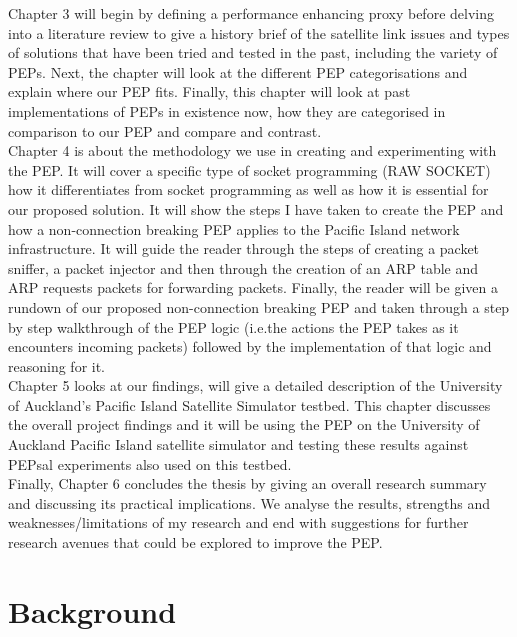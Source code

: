 \documentclass{uathesis}
\begin{document}
Chapter 3 will begin by defining a performance enhancing proxy before delving into a literature review to give a history brief of the satellite link issues and types of solutions that have been tried and tested in the past, including the variety of PEPs. Next, the chapter will look at the different PEP categorisations and explain where our PEP fits. Finally, this chapter will look at past implementations of PEPs in existence now, how they are categorised in comparison to our PEP and compare and contrast. \\ 

Chapter 4 is about the methodology we use in creating and experimenting with the PEP. It will cover a specific type of socket programming (RAW SOCKET) how it differentiates from socket programming as well as how it is essential for our proposed solution. It will show the steps I have taken to create the PEP and how a non-connection breaking PEP applies to the Pacific Island network infrastructure. It will guide the reader through the steps of creating a packet sniffer, a packet injector and then through the creation of an ARP table and ARP requests packets for forwarding packets. Finally, the reader will be given a rundown of our proposed non-connection breaking PEP and taken through a step by step walkthrough of the PEP logic (i.e.the actions the PEP takes as it encounters incoming packets) followed by the implementation of that logic and reasoning for it.\\

Chapter 5 looks at our findings, will give a detailed description of the University of Auckland's Pacific Island Satellite Simulator testbed. This chapter discusses the overall project findings and it will be using the PEP on the University of Auckland Pacific Island satellite simulator and testing these results against PEPsal experiments also used on this testbed.\\

Finally, Chapter 6 concludes the thesis by giving an overall research summary and discussing its practical implications. We analyse the results, strengths and weaknesses/limitations of my research and end with suggestions for further research avenues that could be explored to improve the PEP.

\chapter{Background}
\end{document}
